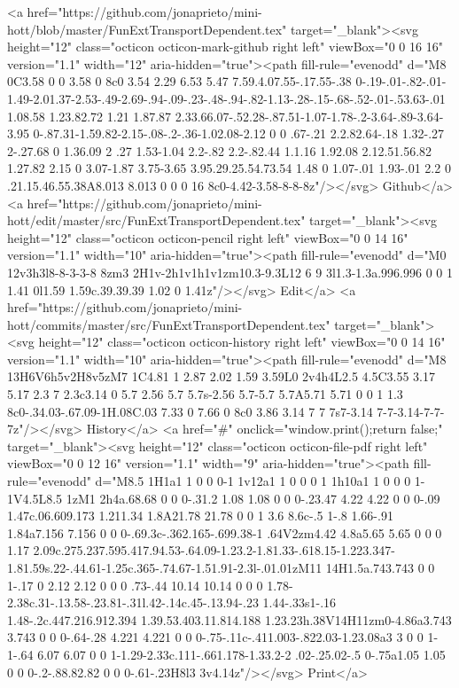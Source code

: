       <a href="https://github.com/jonaprieto/mini-hott/blob/master/FunExtTransportDependent.tex" target="_blank"><svg height="12" class="octicon octicon-mark-github right left" viewBox="0 0 16 16" version="1.1" width="12" aria-hidden="true"><path fill-rule="evenodd" d="M8 0C3.58 0 0 3.58 0 8c0 3.54 2.29 6.53 5.47 7.59.4.07.55-.17.55-.38 0-.19-.01-.82-.01-1.49-2.01.37-2.53-.49-2.69-.94-.09-.23-.48-.94-.82-1.13-.28-.15-.68-.52-.01-.53.63-.01 1.08.58 1.23.82.72 1.21 1.87.87 2.33.66.07-.52.28-.87.51-1.07-1.78-.2-3.64-.89-3.64-3.95 0-.87.31-1.59.82-2.15-.08-.2-.36-1.02.08-2.12 0 0 .67-.21 2.2.82.64-.18 1.32-.27 2-.27.68 0 1.36.09 2 .27 1.53-1.04 2.2-.82 2.2-.82.44 1.1.16 1.92.08 2.12.51.56.82 1.27.82 2.15 0 3.07-1.87 3.75-3.65 3.95.29.25.54.73.54 1.48 0 1.07-.01 1.93-.01 2.2 0 .21.15.46.55.38A8.013 8.013 0 0 0 16 8c0-4.42-3.58-8-8-8z"/></svg> Github</a>
      <a href="https://github.com/jonaprieto/mini-hott/edit/master/src/FunExtTransportDependent.tex" target="_blank"><svg height="12" class="octicon octicon-pencil right left" viewBox="0 0 14 16" version="1.1" width="10" aria-hidden="true"><path fill-rule="evenodd" d="M0 12v3h3l8-8-3-3-8 8zm3 2H1v-2h1v1h1v1zm10.3-9.3L12 6 9 3l1.3-1.3a.996.996 0 0 1 1.41 0l1.59 1.59c.39.39.39 1.02 0 1.41z"/></svg> Edit</a>
      <a href="https://github.com/jonaprieto/mini-hott/commits/master/src/FunExtTransportDependent.tex" target="_blank"><svg height="12" class="octicon octicon-history right left" viewBox="0 0 14 16" version="1.1" width="10" aria-hidden="true"><path fill-rule="evenodd" d="M8 13H6V6h5v2H8v5zM7 1C4.81 1 2.87 2.02 1.59 3.59L0 2v4h4L2.5 4.5C3.55 3.17 5.17 2.3 7 2.3c3.14 0 5.7 2.56 5.7 5.7s-2.56 5.7-5.7 5.7A5.71 5.71 0 0 1 1.3 8c0-.34.03-.67.09-1H.08C.03 7.33 0 7.66 0 8c0 3.86 3.14 7 7 7s7-3.14 7-7-3.14-7-7-7z"/></svg> History</a>
      <a  href="#" onclick="window.print();return false;" target="_blank"><svg height="12" class="octicon octicon-file-pdf right left" viewBox="0 0 12 16" version="1.1" width="9" aria-hidden="true"><path fill-rule="evenodd" d="M8.5 1H1a1 1 0 0 0-1 1v12a1 1 0 0 0 1 1h10a1 1 0 0 0 1-1V4.5L8.5 1zM1 2h4a.68.68 0 0 0-.31.2 1.08 1.08 0 0 0-.23.47 4.22 4.22 0 0 0-.09 1.47c.06.609.173 1.211.34 1.8A21.78 21.78 0 0 1 3.6 8.6c-.5 1-.8 1.66-.91 1.84a7.156 7.156 0 0 0-.69.3c-.362.165-.699.38-1 .64V2zm4.42 4.8a5.65 5.65 0 0 0 1.17 2.09c.275.237.595.417.94.53-.64.09-1.23.2-1.81.33-.618.15-1.223.347-1.81.59s.22-.44.61-1.25c.365-.74.67-1.51.91-2.3l-.01.01zM11 14H1.5a.743.743 0 0 1-.17 0 2.12 2.12 0 0 0 .73-.44 10.14 10.14 0 0 0 1.78-2.38c.31-.13.58-.23.81-.31l.42-.14c.45-.13.94-.23 1.44-.33s1-.16 1.48-.2c.447.216.912.394 1.39.53.403.11.814.188 1.23.23h.38V14H11zm0-4.86a3.743 3.743 0 0 0-.64-.28 4.221 4.221 0 0 0-.75-.11c-.411.003-.822.03-1.23.08a3 3 0 0 1-1-.64 6.07 6.07 0 0 1-1.29-2.33c.111-.661.178-1.33.2-2 .02-.25.02-.5 0-.75a1.05 1.05 0 0 0-.2-.88.82.82 0 0 0-.61-.23H8l3 3v4.14z"/></svg> Print</a>
